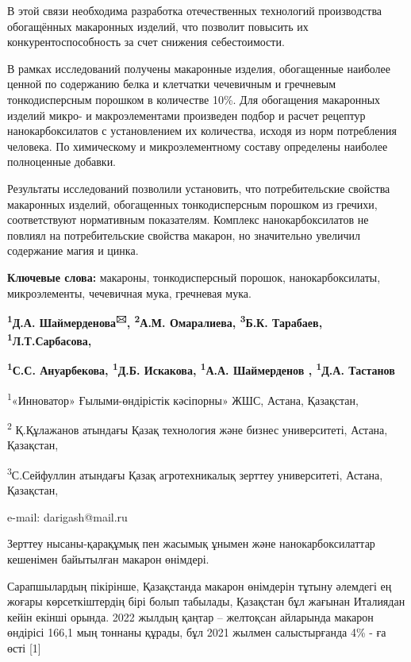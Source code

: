В этой связи необходима разработка отечественных технологий производства
обогащённых макаронных изделий, что позволит повысить их
конкурентоспособность за счет снижения себестоимости.

В рамках исследований получены макаронные изделия, обогащенные наиболее
ценной по содержанию белка и клетчатки чечевичным и гречневым
тонкодисперсным порошком в количестве 10\%. Для обогащения макаронных
изделий микро- и макроэлементами произведен подбор и расчет рецептур
нанокарбоксилатов с установлением их количества, исходя из норм
потребления человека. По химическому и микроэлементному составу
определены наиболее полноценные добавки.

Результаты исследований позволили установить, что потребительские
свойства макаронных изделий, обогащенных тонкодисперсным порошком из
гречихи, соответствуют нормативным показателям. Комплекс
нанокарбоксилатов не повлиял на потребительские свойства макарон, но
значительно увеличил содержание магия и цинка.

{\bfseries Ключевые слова:} макароны, тонкодисперсный порошок,
нанокарбоксилаты, микроэлементы, чечевичная мука, гречневая мука.

\begin{center}

{\bfseries \textsuperscript{1}Д.А. Шаймерденова\textsuperscript{🖂},
\textsuperscript{2}А.М. Омаралиева, \textsuperscript{3}Б.К. Тарабаев,
\textsuperscript{1}Л.Т.Сарбасова,}

{\bfseries \textsuperscript{1}С.С. Ануарбекова, \textsuperscript{1}Д.Б.
Искакова, \textsuperscript{1}А.А. Шаймерденов , \textsuperscript{1}Д.А.
Тастанов}

\textsuperscript{1}«Инноватор» Ғылыми-өндірістік кәсіпорны» ЖШС, Астана,
Қазақстан,

\textsuperscript{2} Қ.Құлажанов атындағы Қазақ технология және бизнес
университеті, Астана, Қазақстан,

\textsuperscript{3}С.Сейфуллин атындағы Қазақ агротехникалық зерттеу
университеті, Астана, Қазақстан,

e-mail: darigash@mail.ru
\end{center}

Зерттеу нысаны-қарақұмық пен жасымық ұнымен және нанокарбоксилаттар
кешенімен байытылған макарон өнімдері.

Сарапшылардың пікірінше, Қазақстанда макарон өнімдерін тұтыну әлемдегі
ең жоғары көрсеткіштердің бірі болып табылады, Қазақстан бұл жағынан
Италиядан кейін екінші орында. 2022 жылдың қаңтар -- желтоқсан айларында
макарон өндірісі 166,1 мың тоннаны құрады, бұл 2021 жылмен салыстырғанда
4\% - ға өсті {[}1{]}

